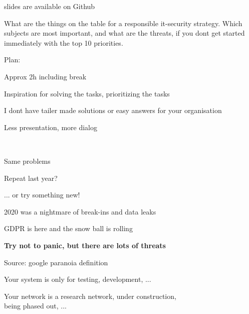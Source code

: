 \documentclass[Screen16to9,17pt]{foils}
\begin{document}


\vskip 1cm
\centerline{\footnotesize slides are available on Github}



What are the things on the table for a responsible it-security strategy. Which subjects are most important, and what are the threats, if you dont get started immediately with the top 10 priorities.


\begin{list2}
\item Plan:
\item Approx 2h including break
\item Inspiration for solving the tasks, prioritizing the tasks
\item I dont have tailer made solutions or easy answers for your organisation
\item Less presentation, more dialog
\end{list2}



{~}

\begin{list2}
\item Same problems
\item Repeat last year?
\item ... or try something new!
\item 2020 was a nightmare of break-ins and data leaks
\item GDPR is here and the snow ball is rolling
\end{list2}

\vskip 1cm
{\LARGE\bf Try not to panic, but there are lots of threats}




Source: google paranoia definition




Your system is only for testing, development, ...

Your network is a research network, under construction, \\
being phased out, ...
\end{document}
